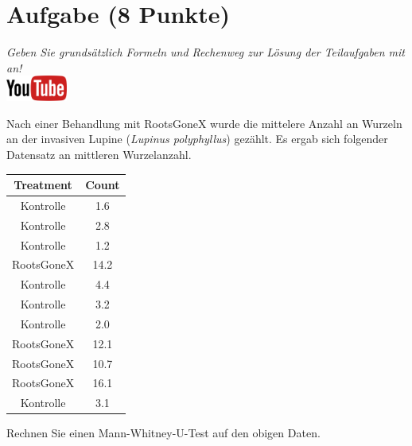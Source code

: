 \documentclass[a4paper, 9pt]{scrartcl}\usepackage[]{graphicx}\usepackage[]{xcolor}
\newenvironment{knitrout}{}{} %
\begin{document}
\section{Aufgabe \hfill (8 Punkte)}

\textit{Geben Sie grunds{\"a}tzlich Formeln und Rechenweg zur L{\"o}sung der
  Teilaufgaben mit an!} \\[1Ex]

\hfill\href{https://youtu.be/5tiJFxuZcco}{\includegraphics[width =
  2cm]{img/youtube}} %
\hspace{2Ex}




Nach einer Behandlung mit RootsGoneX wurde die mittelere Anzahl an Wurzeln
an der invasiven Lupine (\textit{Lupinus polyphyllus}) gez{\"a}hlt. Es ergab sich
folgender Datensatz an mittleren Wurzelanzahl.

\begin{knitrout}
\color{fgcolor}\begin{table}[!h]
\centering
\begin{tabular}{cc}
\toprule
Treatment & Count\\
\midrule
Kontrolle & 1.6\\
Kontrolle & 2.8\\
Kontrolle & 1.2\\
RootsGoneX & 14.2\\
Kontrolle & 4.4\\
\addlinespace
Kontrolle & 3.2\\
Kontrolle & 2.0\\
RootsGoneX & 12.1\\
RootsGoneX & 10.7\\
RootsGoneX & 16.1\\
\addlinespace
Kontrolle & 3.1\\
\bottomrule
\end{tabular}
\end{table}

\end{knitrout}

Rechnen Sie einen Mann-Whitney-U-Test auf den obigen Daten.
\end{document}
